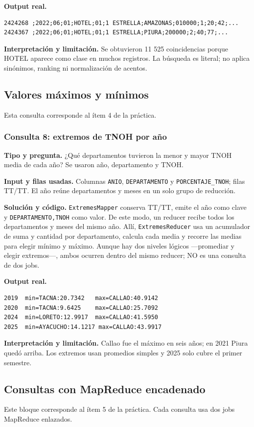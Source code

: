 \documentclass[10pt,a4paper]{article}
\theoremstyle{definition}
\begin{document}
\textbf{Output real.}
\begin{lstlisting}[style=resultado]
2424268 ;2022;06;01;HOTEL;01;1 ESTRELLA;AMAZONAS;010000;1;20;42;...
2424367 ;2022;06;01;HOTEL;01;1 ESTRELLA;PIURA;200000;2;40;77;...
\end{lstlisting}
\textbf{Interpretación y limitación.} Se obtuvieron 11 525 coincidencias porque
HOTEL aparece como clase en muchos registros. La búsqueda es literal; no aplica
sinónimos, ranking ni normalización de acentos.

\subsection{Valores máximos y mínimos}
Esta consulta corresponde al ítem 4 de la práctica.
\subsubsection{Consulta 8: extremos de TNOH por año}
\textbf{Tipo y pregunta.} ¿Qué departamentos tuvieron la menor y mayor TNOH
media de cada año? Se usaron año, departamento y TNOH.

\textbf{Input y filas usadas.} Columnas \texttt{ANIO}, \texttt{DEPARTAMENTO} y
\texttt{PORCENTAJE\_TNOH}; filas TT/TT. El año reúne departamentos y meses en
un solo grupo de reducción.

\textbf{Solución y código.} \texttt{ExtremesMapper} conserva TT/TT, emite el año
como clave y \texttt{DEPARTAMENTO,TNOH} como valor. De este modo, un reducer
recibe todos los departamentos y meses del mismo año. Allí,
\texttt{ExtremesReducer} usa un acumulador de suma y cantidad por departamento,
calcula cada media y recorre las medias para elegir mínimo y máximo. Aunque hay
dos niveles lógicos ---promediar y elegir extremos---, ambos ocurren dentro del
mismo reducer; NO es una consulta de dos jobs.

\textbf{Output real.}
\begin{lstlisting}[style=resultado]
2019  min=TACNA:20.7342   max=CALLAO:40.9142
2020  min=TACNA:9.6425    max=CALLAO:25.7092
2024  min=LORETO:12.9917  max=CALLAO:41.5950
2025  min=AYACUCHO:14.1217 max=CALLAO:43.9917
\end{lstlisting}
\textbf{Interpretación y limitación.} Callao fue el máximo en seis años; en
2021 Piura quedó arriba. Los extremos usan promedios simples y 2025 solo cubre
el primer semestre.

\subsection{Consultas con MapReduce encadenado}
Este bloque corresponde al ítem 5 de la práctica. Cada consulta usa dos jobs
MapReduce enlazados.
\end{document}
